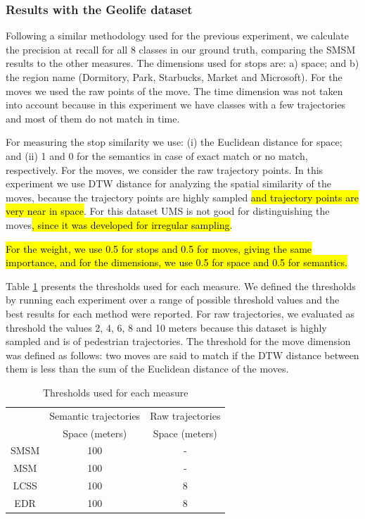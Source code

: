 \documentclass[12pt]{article}
\begin{document}
\subsubsection{Results with the Geolife dataset}

Following a similar methodology used for the previous experiment, we calculate the precision at recall for all 8 classes in our ground truth, comparing the SMSM results to the other measures. The dimensions used for stops are: a) space; and b) the region name (Dormitory, Park, Starbucks, Market and Microsoft). For the moves we used the raw points of the move. The time dimension was not taken into account because in this experiment we have classes with a few trajectories and most of them do not match in time.

For measuring the stop similarity we use: (i) the Euclidean distance for space; and (ii) 1 and 0 for the semantics in case of exact match or no match, respectively. For the moves,  we consider the raw trajectory points. In this experiment we use DTW distance for analyzing the spatial similarity of the moves, because the trajectory points are highly sampled \hl{and trajectory points are very near in space}. %
For this dataset UMS is not good for distinguishing the moves\hl{, since it was developed for irregular sampling}.

\hl{For the weight, we use 0.5 for stops and 0.5 for moves, giving the same importance, and for the dimensions, we use 0.5 for space and 0.5 for semantics.}

Table \ref{tab:geolife_thresholds} presents the thresholds used for each measure. We defined the thresholds by running each experiment over a range of possible threshold values and the best results for each method were reported. For raw trajectories, we evaluated as threshold the  values 2, 4, 6, 8 and 10 meters because this dataset is highly sampled and is of pedestrian trajectories. The threshold for the move dimension was defined as follows: two moves are said to match if the DTW distance between them is less than the sum of the Euclidean distance of the moves.

\begin{table}[!h]
\scriptsize
  \centering
  \begin{tabular}{|c|c|c|}
  	\hline
  & \multicolumn{1}{c|}{Semantic trajectories} & \multicolumn{1}{c|}{Raw trajectories} \\
 	\cline{2-3}
  & Space (meters) & Space (meters) \\
  	\hline
 SMSM & 100 & - \\
 MSM & 100 & - \\
 LCSS & 100 & 8 \\
 EDR & 100 & 8 \\
    \hline
  \end{tabular}
  \caption{Thresholds used for each measure}
  \label{tab:geolife_thresholds}
\end{table}
\end{document}
